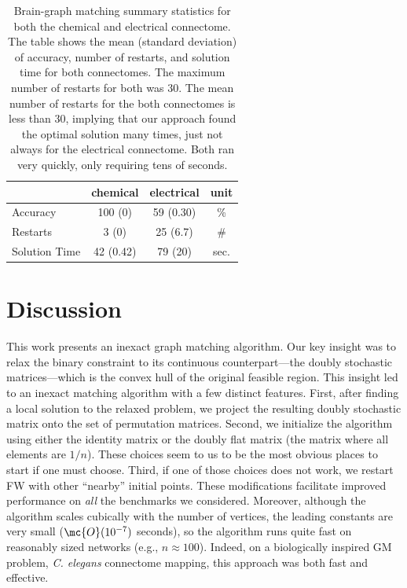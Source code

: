 \documentclass[10pt,journal,cspaper,compsoc]{IEEEtran}
\begin{document}
\begin{table}
\caption{Brain-graph matching summary statistics for both the chemical and electrical connectome.  
The table shows the mean (standard deviation) of accuracy, number of restarts, and solution time for both connectomes.  
The maximum number of restarts for both was 30.  The mean number of restarts for the both connectomes is less than 30, implying that our approach found the optimal solution many times, just not always for the electrical connectome.  Both ran very quickly, only requiring tens of seconds.}
	\label{tab:1}
\begin{center}
\begin{tabular}{|l|c|c|c|}
	\hline  	& chemical 	& electrical 	& unit \\ \hline
	Accuracy  		  	& 100  (0)  & 59 (0.30) 	& \% \\
	Restarts 	  		& 3    (0)  & 25 (6.7)  	& \# \\
	Solution Time  		& 42 (0.42)	& 79 (20)  		& sec. \\ \hline
\end{tabular} 
\end{center}
\end{table}

 


\section{Discussion}

This work presents an inexact graph matching algorithm.  Our key insight was to relax the binary constraint to its continuous counterpart---the doubly stochastic matrices---which is the convex hull of the original feasible region.  This insight led to an inexact matching algorithm with a few distinct features. %
First, after finding a local solution to the relaxed problem, we project the resulting doubly stochastic matrix onto the set of permutation matrices.  Second, we initialize the algorithm using either the identity matrix or the doubly flat matrix (the matrix where all elements are $1/n$).  These choices seem to us to be the most obvious places to start if one must choose.  Third, if one of those choices does not work, we restart FW with other ``nearby'' initial points.  These modifications facilitate improved performance on \emph{all} the benchmarks we considered.  Moreover, although the algorithm scales cubically with the number of vertices, the leading constants are very small ($\mc{O}(10^{-7})$ seconds), so the algorithm runs quite fast on reasonably sized networks (e.g., $n \approx 100$).  Indeed, on a biologically inspired GM problem, \emph{C. elegans} connectome mapping, this approach was both fast and effective.  
\end{document}
